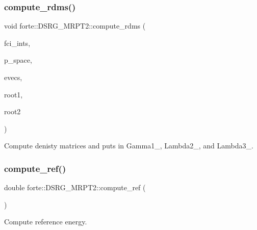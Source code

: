 \subsubsection{\texorpdfstring{compute\+\_\+rdms()}{compute\_rdms()}}
{\footnotesize\ttfamily void forte\+::\+D\+S\+R\+G\+\_\+\+M\+R\+P\+T2\+::compute\+\_\+rdms (\begin{DoxyParamCaption}\item[{std\+::shared\+\_\+ptr$<$ \mbox{\hyperlink{classforte_1_1_active_space_integrals}{Active\+Space\+Integrals}} $>$}]{fci\+\_\+ints,  }\item[{std\+::vector$<$ \mbox{\hyperlink{namespaceforte_a2076c63fd7b8732004d9e1442ce527c1}{Determinant}} $>$ \&}]{p\+\_\+space,  }\item[{psi\+::\+Shared\+Matrix}]{evecs,  }\item[{const int \&}]{root1,  }\item[{const int \&}]{root2 }\end{DoxyParamCaption})\hspace{0.3cm}{\ttfamily [protected]}}



Compute denisty matrices and puts in Gamma1\+\_\+, Lambda2\+\_\+, and Lambda3\+\_\+. 

\mbox{\label{classforte_1_1_d_s_r_g___m_r_p_t2_a4500344800c525a638a373cc961952fd}} 
\subsubsection{\texorpdfstring{compute\+\_\+ref()}{compute\_ref()}}
{\footnotesize\ttfamily double forte\+::\+D\+S\+R\+G\+\_\+\+M\+R\+P\+T2\+::compute\+\_\+ref (\begin{DoxyParamCaption}{ }\end{DoxyParamCaption})\hspace{0.3cm}{\ttfamily [protected]}}



Compute reference energy. 

\mbox{\label{classforte_1_1_d_s_r_g___m_r_p_t2_ad87625724c9dc201aacd227d5238911d}} 
